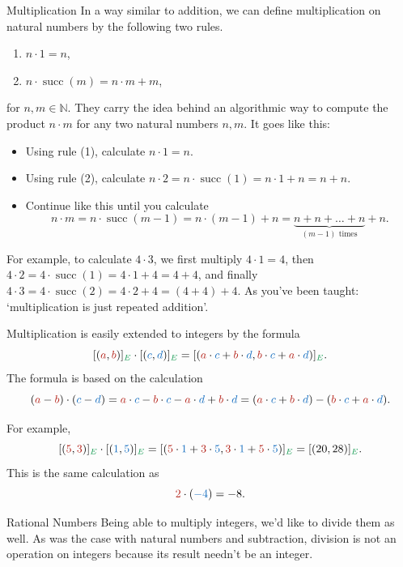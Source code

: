 \documentclass[final]{beamer}
\newlength{\colwidth}
\newcommand{\N}{\mathbb{N}}
\DeclareMathOperator{\s}{succ}
\newcommand{\clr}{\textcolor{BrickRed}}
\newcommand{\clb}{\textcolor{RoyalBlue}}
\newcommand{\clg}{\textcolor{ForestGreen}}
\begin{document}
\begin{frame}[t]
\begin{columns}[t]
\begin{column}{\colwidth}
\begin{block}{Multiplication}
 In a way similar to addition, we can define \alert{multiplication} on natural
 numbers by the following two rules.
 \begin{enumerate}[label=(\arabic*),left=12pt]
  \item $n \cdot 1 = n$,
  \item $n \cdot \s(m) = n \cdot m + m$,
 \end{enumerate}
 for $n,m \in \N$. They carry the idea behind an algorithmic way to compute the
 product $n \cdot m$ for any two natural numbers $n,m$. It goes like this:
 \begin{itemize}[left=12pt,label=\textbullet]
  \item Using rule (1), calculate $n \cdot 1 = n$.
  \item Using rule (2), calculate $n \cdot 2 = n \cdot \s(1) = n \cdot 1 + n = n
   + n$.
  \item Continue like this until you calculate
   \[
    n \cdot m = n \cdot \s(m - 1) = n \cdot (m - 1) + n = \underbrace{n + n +
    \ldots + n}_{(m - 1)\text{ times}} + n.
   \]
 \end{itemize}
 For example, to calculate $4 \cdot 3$, we first multiply $4 \cdot 1 = 4$, then
 $4 \cdot 2 = 4 \cdot \s(1) = 4 \cdot 1 + 4 = 4 + 4$, and finally $4 \cdot 3 = 4
 \cdot \s(2) = 4 \cdot 2 + 4 = (4 + 4) + 4$. As you've been taught:
 `multiplication is just repeated addition'.

 Multiplication is easily extended to integers by the formula
 \[
  [(\clr{a},\clr{b})]_{\clg{E}} \cdot [(\clb{c},\clb{d})]_{\clg{E}} = [(\clr{a}
  \cdot \clb{c} + \clr{b} \cdot \clb{d}, \clr{b} \cdot \clb{c} + \clr{a} \cdot
  \clb{d})]_{\clg{E}}.
 \]
 The formula is based on the calculation
 \[
  (\clr{a} - \clr{b}) \cdot (\clb{c} - \clb{d}) = \clr{a} \cdot \clb{c} -
  \clr{b} \cdot \clb{c} - \clr{a} \cdot \clb{d} + \clr{b} \cdot \clb{d} =
  (\clr{a} \cdot \clb{c} + \clr{b} \cdot \clb{d}) - (\clr{b} \cdot \clb{c} +
  \clr{a} \cdot \clb{d}).
 \]

 For example,
 \[
  [(\clr{5},\clr{3})]_{\clg{E}} \cdot [(\clb{1},\clb{5})]_{\clg{E}} =
  [(\clr{5} \cdot \clb{1} + \clr{3} \cdot \clb{5}, \clr{3} \cdot \clb{1} +
  \clr{5} \cdot \clb{5})]_{\clg{E}} = [(20, 28)]_{\clg{E}}.
 \]
 This is the same calculation as
 \[
  \clr{2} \cdot (\clb{-4}) = -8.
 \]
\end{block}

\begin{exampleblock}{Rational Numbers}
 Being able to \alert{multiply integers}, we'd like to divide them as well. As
 was the case with natural numbers and subtraction, \alert{division is not an
 operation on integers} because its result needn't be an integer.


\end{exampleblock}
\end{column}
\end{columns}
\end{frame}
\end{document}
